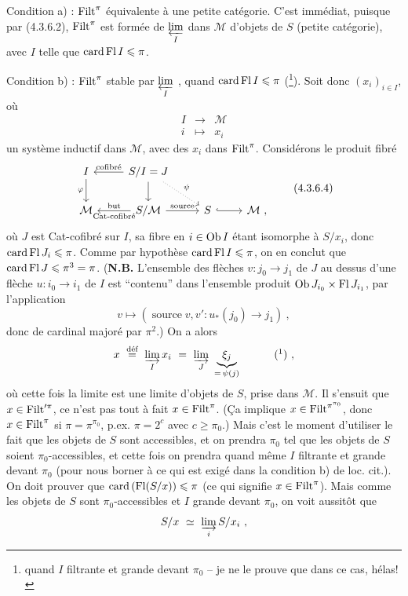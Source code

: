 
\noindent{}Condition a) : $\operatorname{Filt}^\pi$ équivalente à une petite catégorie. C'est immédiat, puisque par (4.3.6.2), $\operatorname{Filt}^\pi$ est formée de $\varprojlim\limits_I$ dans $\mathcal M$ d'objets de $S$ (petite catégorie), avec $I$ telle que $\operatorname{card}\operatorname{Fl} I\leqslant\pi$.

\noindent Condition b) : $\operatorname{Filt}^\pi$ stable par $\varprojlim\limits_I$ , quand $\operatorname{card}\operatorname{Fl} I\leqslant\pi$ (\footnote{quand $I$ filtrante et grande devant $\pi_0$ -- je ne le prouve que dans ce cas, hélas!}). Soit donc $(x_i)_{i\in I}$, où
\[
\begin{array}{ccc}
I & \longrightarrow & \mathcal M\\[1ex]
i & \longmapsto & x_i
\end{array}
\]
un système inductif dans $\mathcal M$, avec des $x_i$ dans $\operatorname{Filt}^\pi$. Considérons le produit fibré
\[
\begin{tikzcd}
I \arrow[d, "\varphi"'] & S/I = J \arrow[l, "\text{cofibré}"'] \arrow[d] \arrow[dr, dotted, "\psi"] & & \\
\mathcal M & S/\mathcal M \arrow[l, "\text{but}"', "\text{Cat-cofibré}"] \arrow[r, "\text{source}"] & S \arrow[r, hook] & \mathcal M\ ,
\end{tikzcd}
\tag*{(4.3.6.4)}
\]
où $J$ est Cat-cofibré sur $I$, sa fibre en $i\in\mathrm{Ob}\, I$ étant isomorphe à $S/x_i$, donc $\operatorname{card}\operatorname{Fl} J_i\leqslant\pi$. Comme par hypothèse $\operatorname{card}\operatorname{Fl} I\leqslant\pi$, on en conclut que $\operatorname{card}\operatorname{Fl} J\leqslant\pi^3=\pi$. (\textbf{N.B.} L'ensemble des flèches $v:j_0\longrightarrow j_1$ de $J$ au dessus d'une flèche $u:i_0\longrightarrow i_1$ de $I$ est “contenu” dans l'ensemble produit $\mathrm{Ob}\, J_{i_0}\times\operatorname{Fl} J_{i_1}$, par l'application
\[
v\longmapsto(\operatorname{source}v,v':u_*(j_0)\longrightarrow j_1)\ ,
\]
donc de cardinal majoré par $\pi^2$.) On a alors
\[
x\ \overset{\text{déf}}{=}\ \varinjlim_I x_i\ =\ \varinjlim_J\ \underbrace{\xi_j}_{=\,\psi(j)}\qquad\quad\mbox{(\footnotemark)}\ ,
\]
%
où cette fois la limite est une limite d'objets de $S$, prise dans $\mathcal M$. Il s'ensuit que $x\in\operatorname{Filt}'^{\pi}$, ce n'est pas tout à fait $x\in\operatorname{Filt}^\pi$. (Ça implique $x\in\operatorname{Filt}^{\pi^{\pi_0}}$, donc $x\in\operatorname{Filt}^\pi$ si $\pi=\pi^{\pi_0}$, p.ex. $\pi=2^c$ avec $c\geqslant\pi_0$.) Mais c'est le moment d'utiliser le fait que les objets de $S$ sont accessibles, et on prendra $\pi_0$ tel que les objets de $S$ soient $\pi_0$-accessibles, et cette fois on prendra quand même $I$ filtrante et grande devant $\pi_0$ (pour nous borner à ce qui est exigé dans la condition b) de loc. cit.). On doit prouver que $\operatorname{card}\,(\operatorname{Fl}(S/x))\leqslant\pi$ (ce qui signifie $x\in\operatorname{Filt}^\pi$). Mais comme les objets de $S$ sont $\pi_0$-accessibles et $I$ grande devant $\pi_0$, on voit aussitôt que
\[
S/x\ \simeq\ \varinjlim_i S/x_i\ ,
\]

